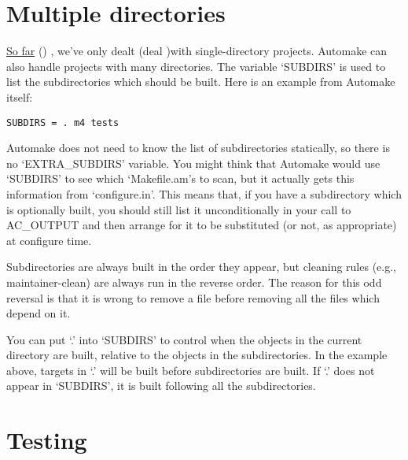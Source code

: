 \section{Multiple directories}

\underline{So far} ({\MaQ{}}) , we've 
only dealt (deal {\MbQ{}})with single-directory 
projects. Automake can also handle projects with many directories. The 
variable `SUBDIRS' is used to list the subdirectories which should be 
built. Here is an example from Automake itself: 


\begin{Verbatim}[frame=single]
SUBDIRS = . m4 tests
\end{Verbatim}

Automake does not need to know the list of subdirectories statically, so 
there is no `EXTRA\_{}SUBDIRS' variable. You might think that Automake would 
use `SUBDIRS' to see which `Makefile.am's to scan, but it actually 
gets this information from `configure.in'. This means that, if you have a 
subdirectory which is optionally built, you should still list it 
unconditionally in your call to AC\_{}OUTPUT and then arrange for it to be 
substituted (or not, as appropriate) at configure time. 


Subdirectories are always built in the order they 
appear,
but cleaning rules (e.g., maintainer-clean) are always run in the reverse order. The reason for this odd reversal is that it is wrong to remove a file before removing all the files which depend on it. 


You can put `.' into `SUBDIRS' to control when the objects in the current directory are built, relative to the objects in the subdirectories. In the example above, targets in `.' will be built before subdirectories are built. If `.' does not appear in `SUBDIRS', it is built following all the subdirectories.

\section{Testing}


